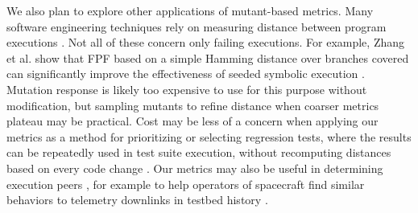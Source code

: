 We also plan to explore other applications of mutant-based metrics.
Many software engineering techniques rely on measuring distance
between program executions \cite{BallConcept,NearNeighbor}.  Not all
of these concern only failing
executions.  For example, Zhang et al. \cite{issta14} show that FPF based on a simple
Hamming distance over branches covered can significantly improve the
effectiveness of seeded symbolic execution
\cite{Zesti,PersonSeed,BugRedux}.  Mutation response is likely too
expensive to use for this purpose without modification, but sampling
mutants to refine distance when coarser metrics plateau
may be practical.  Cost may be less of a concern when applying our
metrics as a method for prioritizing or selecting regression tests,
where the results can be repeatedly used in test suite execution,
without recomputing distances based on every code change
\cite{YooHarman}.  Our metrics may also be useful in determining
execution peers \cite{Sumner2011}, for example to help operators of
spacecraft find similar behaviors to telemetry downlinks in testbed
history \cite{KlausRajeev,scriptstospecs}.